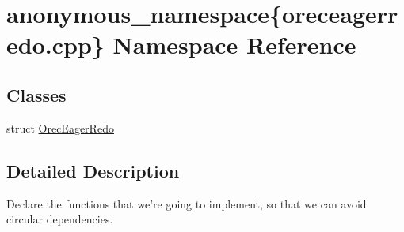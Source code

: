 \hypertarget{namespaceanonymous__namespace_02oreceagerredo_8cpp_03}{\section{anonymous\-\_\-namespace\{oreceagerredo.\-cpp\} Namespace Reference}
\label{namespaceanonymous__namespace_02oreceagerredo_8cpp_03}
}
\subsection*{Classes}
\begin{DoxyCompactItemize}
\item 
struct \hyperlink{structanonymous__namespace_02oreceagerredo_8cpp_03_1_1OrecEagerRedo}{Orec\-Eager\-Redo}
\end{DoxyCompactItemize}


\subsection{Detailed Description}
Declare the functions that we're going to implement, so that we can avoid circular dependencies. 